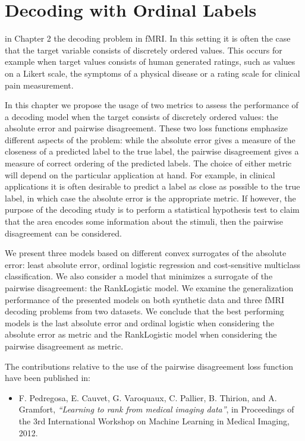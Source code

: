\chapter{Decoding with Ordinal Labels}\label{chap:decoding_ordinal}


\vspace*{\fill}
 in Chapter 2 the decoding problem in fMRI. In this setting it is often the case that the target variable consists of discretely ordered values. This occurs for example when target values consists of human generated ratings, such as values on a Likert scale, the symptoms of a physical disease or a rating scale for clinical pain measurement.

In this chapter we propose the usage of two metrics to assess the performance of a decoding model when the target consists of discretely ordered values: the absolute error and pairwise disagreement. These two loss functions emphasize different aspects of the problem: while the absolute error gives a measure of the closeness of a predicted label to the true label, the pairwise disagreement gives a measure of correct ordering of the predicted labels. The choice of either metric will depend on the particular application at hand. For example, in clinical applications it is often desirable to predict a label as close as possible to the true label, in which case the absolute error is the appropriate metric. If however, the purpose of the decoding study is to perform a statistical hypothesis test to claim that the area encodes some information about the stimuli, then the pairwise disagreement can be considered.


We present three models based on different convex surrogates of the absolute error: least absolute error, ordinal logistic regression and cost-sensitive multiclass classification. We also consider a model that minimizes a surrogate of the pairwise disagreement: the RankLogistic model. We examine the generalization performance of the presented models on both synthetic data and three fMRI decoding problems from two datasets. We conclude that the best performing models is the last absolute error and ordinal logistic when considering the absolute error as metric and the RankLogistic model when considering the pairwise disagreement as metric. 



\begin{shaded}
The contributions relative to the use of the pairwise disagreement loss function have been published in:
\begin{itemize}
\item F. Pedregosa, E. Cauvet, G. Varoquaux, C. Pallier, B. Thirion, and A. Gramfort, \emph{``Learning to rank from medical imaging data''}, in Proceedings of the 3rd International Workshop on Machine Learning in Medical Imaging, 2012.
\end{itemize}
\end{shaded}

